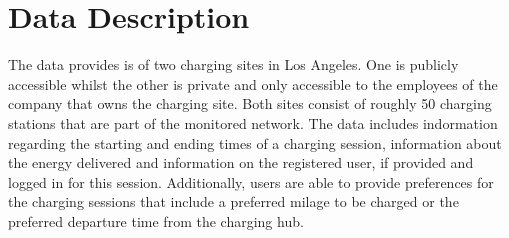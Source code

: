 \section{Data Description}

The data provides is of two charging sites in Los Angeles.
One is publicly accessible whilst the other is private and only accessible to the employees of the company that owns the charging site.
Both sites consist of roughly 50 charging stations that are part of the monitored network.
The data includes indormation regarding the starting and ending times of a charging session, information about the energy delivered and information on the registered user, if provided and logged in for this session.
Additionally, users are able to provide preferences for the charging sessions that include a preferred milage to be charged or the preferred departure time from the charging hub.
